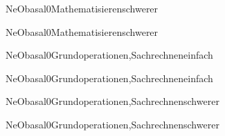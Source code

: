 \documentclass[12pt]{article}
\begin{document}
\begin{Add}{NeO}{basal0}{Mathematisieren}{schwerer}
\solution{ }
\end{Add}
\begin{Add}{NeO}{basal0}{Mathematisieren}{schwerer}
\end{Add}

\begin{Add}{NeO}{basal0}{Grundoperationen,Sachrechnen}{einfach}
\solution{ }
\end{Add}
\begin{Add}{NeO}{basal0}{Grundoperationen,Sachrechnen}{einfach}
\end{Add}

\begin{Add}{NeO}{basal0}{Grundoperationen,Sachrechnen}{schwerer}
\solution{ }
\end{Add}
\begin{Add}{NeO}{basal0}{Grundoperationen,Sachrechnen}{schwerer}
\end{Add}
\end{document}
